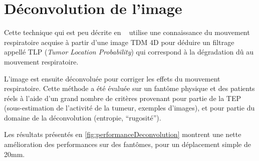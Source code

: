 \section{Déconvolution de l'image}

Cette technique qui est peu décrite en ~\cite{naqa2006deblurring} utilise une connaissance du mouvement respiratoire acquise à partir d'une image TDM 4D pour déduire un filtrage appellé TLP (\textit{Tumor Location Probability}) qui correspond à la dégradation dû au mouvement respiratoire.

L'image est ensuite déconvoluée pour corriger les effets du mouvement respiratoire. Cette méthode a été évaluée sur un fantôme physique et des patients réels à l'aide d'un grand nombre de critères provenant pour partie de la TEP (sous-estimation de l'activité de la tumeur, exemples d'images), et pour partie du domaine de la déconvolution (entropie, ``rugosité'').

Les résultats présentés en \ref{fig:performanceDeconvolution} montrent une nette amélioration des performances sur des fantômes, pour un déplacement simple de 20mm.

